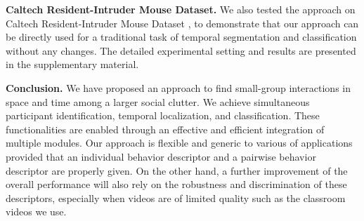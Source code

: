 \vspace{0.05in}

\noindent\textbf{Caltech Resident-Intruder Mouse Dataset.} We also tested the approach on Caltech Resident-Intruder Mouse Dataset \cite{CRIM13}, to demonstrate that our approach can be directly used for a traditional task of temporal segmentation and classification without any changes. The detailed experimental setting and results are presented in the supplementary material.


\vspace{0.05in}

\noindent\textbf{Conclusion.} We have proposed an approach to find small-group interactions in space and time among a larger social clutter. We achieve simultaneous participant identification, temporal localization, and classification. These functionalities are enabled through an effective and efficient integration of multiple modules. Our approach is flexible and generic to various of applications provided that an individual behavior descriptor and a pairwise behavior descriptor are properly given. On the other hand, a further improvement of the overall performance will also rely on the robustness and discrimination of these descriptors, especially when videos are of limited quality such as the classroom videos we use. 




